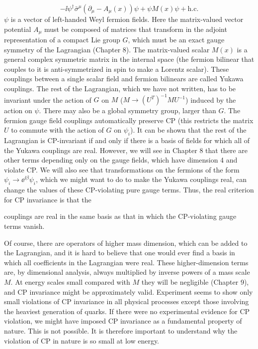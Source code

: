 \begin{equation}
  -\ii\psi^\dagger\bar\sigma^\mu(\partial_\mu-A_\mu(x))\psi+\psi M(x)\psi+\mathrm{h.c.}
  \label{eq:5.6}
\end{equation}
$\psi$ is a vector of left-handed Weyl fermion fields. Here the matrix-valued vector potential
$A_\mu$ must be composed of matrices that transform in the adjoint representation of a
compact Lie group $G$, which must be an exact gauge symmetry of the Lagrangian
(Chapter 8). The matrix-valued scalar $M(x)$ is a general complex symmetric matrix in
the internal space (the fermion bilinear that couples to it is anti-symmetrized in spin
to make a Lorentz scalar). These couplings between a single scalar field and fermion
bilinears are called Yukawa couplings. The rest of the Lagrangian, which we have not
written, has to be invariant under the action of $G$ on $M$ ($M\to(U^T)^{-1}MU^{-1}$) induced
by the action on $\psi$. There may also be a global symmetry group, larger than $G$. The
fermion gauge field couplings automatically preserve CP (this restricts the matrix $U$
to commute with the action of $G$ on $\psi_i$). It can be shown \cite{banks-ref-30} that the rest of the
Lagrangian is CP-invariant if and only if there is a basis of fields for which all of the
Yukawa couplings are real. However, we will see in Chapter 8 that there are other
terms depending only on the gauge fields, which have dimension 4 and violate CP. We
will also see that transformations on the fermions of the form $\psi_i\to\ee^{\ii\beta}\psi_i$, which we
might want to do to make the Yukawa couplings real, can change the values of these
CP-violating pure gauge terms. Thus, the real criterion for CP invariance is that the

couplings are real in the same basis as that in which the CP-violating gauge terms
vanish.


Of course, there are operators of higher mass dimension, which can be added to the
Lagrangian, and it is hard to believe that one would ever find a basis in which
all coefficients in the Lagrangian were real. These higher-dimension terms are, by
dimensional analysis, always multiplied by inverse powers of a mass scale $M$. At energy
scales small compared with $M$ they will be negligible (Chapter 9), and CP invariance
might be approximately valid. Experiment seems to show only small violations of CP
invariance in all physical processes except those involving the heaviest generation of
quarks. If there were no experimental evidence for CP violation, we might have imposed
CP invariance as a fundamental property of nature. This is not possible. It is therefore
important to understand why the violation of CP in nature is so small at low energy.

